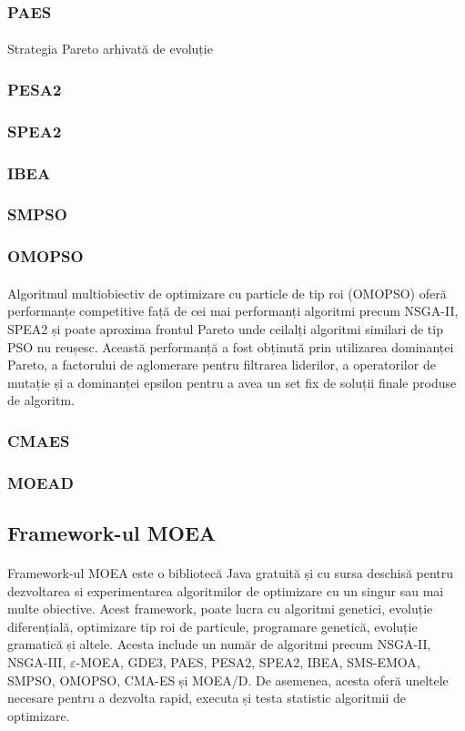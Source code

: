 \documentclass[12pt]{article}
\begin{document}
\subsubsection{PAES}
\paragraph{}
Strategia Pareto arhivată de evoluție
\subsubsection{PESA2}
\subsubsection{SPEA2}
\subsubsection{IBEA}
\subsubsection{SMPSO}
\subsubsection{OMOPSO}
\paragraph{}
Algoritmul multiobiectiv de optimizare cu particle de tip roi (OMOPSO) oferă performanțe competitive față de cei mai performanți algoritmi precum NSGA-II, SPEA2 și poate aproxima frontul Pareto unde ceilalți algoritmi similari de tip PSO nu reușesc. Această performanță a fost obținută prin utilizarea dominanței Pareto, a factorului de aglomerare pentru filtrarea liderilor, a operatorilor de mutație și a dominanței epsilon pentru a avea un set fix de soluții finale produse de algoritm. \cite{omopso}
\subsubsection{CMAES}
\subsubsection{MOEAD}
\subsection{Framework-ul MOEA}
\paragraph{}
Framework-ul MOEA este o bibliotecă Java gratuită și cu sursa deschisă pentru dezvoltarea si experimentarea algoritmilor de optimizare cu un singur sau mai multe obiective. Acest framework, poate lucra cu algoritmi genetici, evoluție diferențială, optimizare tip roi de particule, programare genetică, evoluție gramatică și altele. Acesta include un număr de algoritmi precum NSGA-II, NSGA-III, $\varepsilon$-MOEA, GDE3, PAES, PESA2, SPEA2, IBEA, SMS-EMOA, SMPSO, OMOPSO, CMA-ES și MOEA/D. De asemenea, acesta oferă uneltele necesare pentru a dezvolta rapid, executa și testa statistic algoritmii de optimizare.  \cite{moeawebsite}
\end{document}
